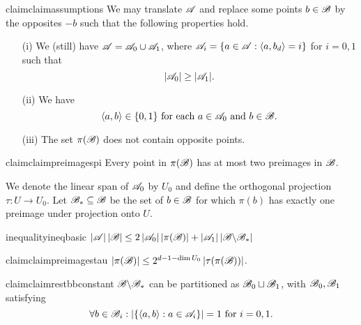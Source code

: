\begin{restatable}{claim}{claimassumptions}
    \label{cl1}
    We may translate ${\mathscr{A}}$ and replace some points $b\in{\mathscr{B}}$ by the opposites $-b$ such that the following properties hold.
    \begin{itemize}
        \item[(i)] We (still) have ${\mathscr{A}} = {\mathscr{A}}_0 \cup {\mathscr{A}}_1$, where ${\mathscr{A}}_i = \{ a \in {\mathscr{A}} : \langle a, b_d\rangle = i\}$ for $i=0,1$ such that
            \begin{equation} \label{eqa0gea1}
                |{\mathscr{A}}_0| \ge |{\mathscr{A}}_1|.
            \end{equation}
        \item[(ii)] We  have
            \begin{equation}
                \label{eqscala0}
                \langle a, b\rangle \in \{0,1\} \text{ for each } a \in {\mathscr{A}}_0 \text{ and } b \in {\mathscr{B}}.
            \end{equation}
        \item[(iii)] The set $\pi({\mathscr{B}})$ does not contain opposite points.
    \end{itemize}
\end{restatable}

\begin{restatable}{claim}{claimpreimagespi}\label{cl2}
   Every point in $\pi({\mathscr{B}})$ has at most two preimages in ${\mathscr{B}}$.
\end{restatable}

We denote the linear span of ${\mathscr{A}}_0$ by $U_0$ and define the orthogonal projection $\tau: U \rightarrow U_0$. Let ${\mathscr{B}}_* \subseteq {\mathscr{B}}$ be the set of $b \in {\mathscr{B}}$ for which $\pi(b)$ has exactly one preimage under projection onto $U$.

\begin{restatable}{inequality}{ineqbasic}\label{in0}
   $\left|{\mathscr{A}}\right|\left|{\mathscr{B}}\right| \leq 2\left|{\mathscr{A}}_0\right||\pi({\mathscr{B}})|+\left|{\mathscr{A}}_1\right|\left|{\mathscr{B}} \backslash {\mathscr{B}}_*\right|$
\end{restatable}


\begin{restatable}{claim}{claimpreimagestau}\label{cl3}
    $\left|\pi({\mathscr{B}})\right| \leq 2^{d-1-\operatorname{dim} U_0}\left|\tau(\pi({\mathscr{B}}))\right|$.
\end{restatable}

\begin{restatable}{claim}{claimrestbbconstant}\label{cl4}
    ${\mathscr{B}} \backslash {\mathscr{B}}_* $ can be partitioned as $ {\mathscr{B}}_0 \sqcup {\mathscr{B}}_1$, with ${\mathscr{B}}_0, {\mathscr{B}}_1$ satisfying
    \[
        \forall b\in{\mathscr{B}}_i: \left|\left\{\langle a, b\rangle: a \in {\mathscr{A}}_i\right\}\right|=1\text{ for }i=0, 1.
    \]
\end{restatable}

